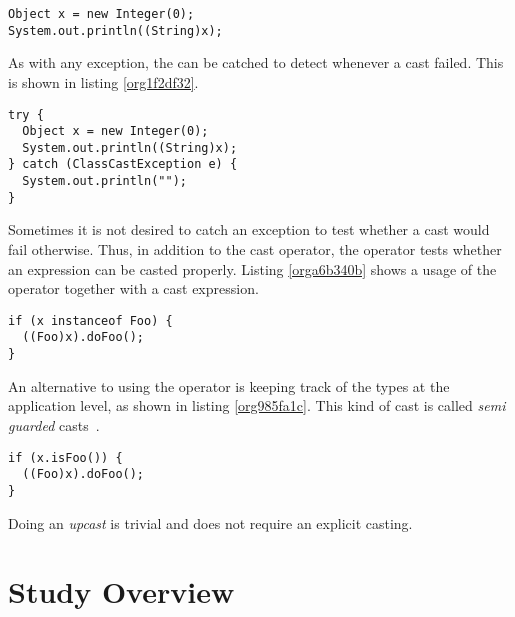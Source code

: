 \documentclass{usiinfdocprop}
\begin{document}
\begin{lstlisting}
Object x = new Integer(0); 
System.out.println((String)x); 
\end{lstlisting}

As with any exception, the \cce{} can be catched to detect whenever a cast failed. 
This is shown in listing \ref{org1f2df32}. 

\begin{lstlisting}
try { 
  Object x = new Integer(0); 
  System.out.println((String)x); 
} catch (ClassCastException e) { 
  System.out.println(""); 
} 
\end{lstlisting}

Sometimes it is not desired to catch an exception to test whether a cast would fail otherwise. 
Thus, in addition to the cast operator, the \instanceof{} operator tests whether an expression can be casted properly. 
Listing \ref{orga6b340b} shows a usage of the \instanceof{} operator together with a cast expression. 

\begin{lstlisting}
if (x instanceof Foo) { 
  ((Foo)x).doFoo(); 
} 
\end{lstlisting}

An alternative to using the \instanceof{} operator is keeping track of the 
types at the application level, as shown in listing \ref{org985fa1c}. 
This kind of cast is called \emph{semi guarded} casts~\cite{winther_guarded_2011}. 

\begin{lstlisting}
if (x.isFoo()) { 
  ((Foo)x).doFoo(); 
} 
\end{lstlisting}

Doing an \emph{upcast} is trivial and does not require an explicit casting. 

\section{Study Overview \label{org8065fcf}}
\label{sec:orga9e9ff5}
\end{document}
